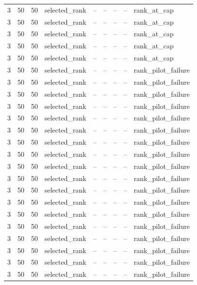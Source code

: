 \begin{longtable}{lllllllll}
3 & 50 & 50 & selected\_rank & -- & -- & -- & -- & rank\_at\_cap \\
3 & 50 & 50 & selected\_rank & -- & -- & -- & -- & rank\_at\_cap \\
3 & 50 & 50 & selected\_rank & -- & -- & -- & -- & rank\_at\_cap \\
3 & 50 & 50 & selected\_rank & -- & -- & -- & -- & rank\_at\_cap \\
3 & 50 & 50 & selected\_rank & -- & -- & -- & -- & rank\_at\_cap \\
3 & 50 & 50 & selected\_rank & -- & -- & -- & -- & rank\_pilot\_failure \\
3 & 50 & 50 & selected\_rank & -- & -- & -- & -- & rank\_pilot\_failure \\
3 & 50 & 50 & selected\_rank & -- & -- & -- & -- & rank\_pilot\_failure \\
3 & 50 & 50 & selected\_rank & -- & -- & -- & -- & rank\_pilot\_failure \\
3 & 50 & 50 & selected\_rank & -- & -- & -- & -- & rank\_pilot\_failure \\
3 & 50 & 50 & selected\_rank & -- & -- & -- & -- & rank\_pilot\_failure \\
3 & 50 & 50 & selected\_rank & -- & -- & -- & -- & rank\_pilot\_failure \\
3 & 50 & 50 & selected\_rank & -- & -- & -- & -- & rank\_pilot\_failure \\
3 & 50 & 50 & selected\_rank & -- & -- & -- & -- & rank\_pilot\_failure \\
3 & 50 & 50 & selected\_rank & -- & -- & -- & -- & rank\_pilot\_failure \\
3 & 50 & 50 & selected\_rank & -- & -- & -- & -- & rank\_pilot\_failure \\
3 & 50 & 50 & selected\_rank & -- & -- & -- & -- & rank\_pilot\_failure \\
3 & 50 & 50 & selected\_rank & -- & -- & -- & -- & rank\_pilot\_failure \\
3 & 50 & 50 & selected\_rank & -- & -- & -- & -- & rank\_pilot\_failure \\
3 & 50 & 50 & selected\_rank & -- & -- & -- & -- & rank\_pilot\_failure \\
3 & 50 & 50 & selected\_rank & -- & -- & -- & -- & rank\_pilot\_failure \\
3 & 50 & 50 & selected\_rank & -- & -- & -- & -- & rank\_pilot\_failure \\
3 & 50 & 50 & selected\_rank & -- & -- & -- & -- & rank\_pilot\_failure \\

\end{longtable}
